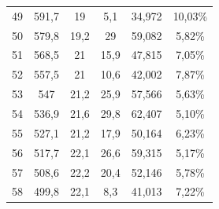 \begin{longtable}[H]{cccccc}
  49          & 591,7                & 19            & 5,1            & 34,972        & 10,03\%                              \\
  50          & 579,8                & 19,2          & 29             & 59,082        & 5,82\%                               \\
  51          & 568,5                & 21            & 15,9           & 47,815        & 7,05\%                               \\
  52          & 557,5                & 21            & 10,6           & 42,002        & 7,87\%                               \\
  53          & 547                  & 21,2          & 25,9           & 57,566        & 5,63\%                               \\
  54          & 536,9                & 21,6          & 29,8           & 62,407        & 5,10\%                               \\
  55          & 527,1                & 21,2          & 17,9           & 50,164        & 6,23\%                               \\
  56          & 517,7                & 22,1          & 26,6           & 59,315        & 5,17\%                               \\
  57          & 508,6                & 22,2          & 20,4           & 52,146        & 5,78\%                               \\
  58          & 499,8                & 22,1          & 8,3            & 41,013        & 7,22\%                               \\
\end{longtable}


